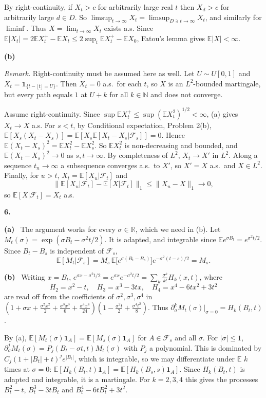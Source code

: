 \documentclass[11pt,a4paper]{article}
\newcommand{\E}{\mathbb{E}}
\newcommand{\R}{\mathbb{R}}
\newcommand{\N}{\mathbb{N}}
\newcommand{\F}{\mathcal{F}}
\newcommand{\1}{\mathbf{1}}
\newcommand{\prob}[1]{\par\medskip\noindent\textbf{#1}\quad}
\newcommand{\sub}[1]{\par\smallskip\noindent\textbf{#1}\ }
\newcommand{\note}[1]{\par\noindent\emph{Remark.} #1}
\begin{document}
By right-continuity, if $X_t>c$ for arbitrarily large real $t$ then $X_d>c$ for arbitrarily large $d\in D$. So
$\limsup_{t\to\infty}X_t=\limsup_{D\ni t\to\infty}X_t$, and similarly for $\liminf$. Thus $X=\lim_{t\to\infty}X_t$ exists a.s.
Since $\E|X_t|=2\E X_t^+-\E X_t\le2\sup_t\E X_t^+-\E X_0$, Fatou's lemma gives $\E|X|<\infty$.

\sub{(b)} \note{Right-continuity must be assumed here as well. Let $U\sim U[0,1]$ and
$X_t=\1_{\{t-\lfloor t\rfloor=U\}}$. Then $X_t=0$ a.s.\ for each $t$, so $X$ is an $L^2$-bounded martingale, but
every path equals $1$ at $U+k$ for all $k\in\N$ and does not converge.}

Assume right-continuity. Since $\sup\E X_t^+\le\sup(\E X_t^2)^{1/2}<\infty$, (a) gives $X_t\to X$ a.s.
For $s<t$, by Conditional expectation, Problem 2(b), $\E[X_s(X_t-X_s)]=\E[X_s\E[X_t-X_s|\F_s]]=0$. Hence
$\E(X_t-X_s)^2=\E X_t^2-\E X_s^2$. So $\E X_t^2$ is non-decreasing and bounded, and $\E(X_t-X_s)^2\to0$ as $s,t\to\infty$.
By completeness of $L^2$, $X_t\to X'$ in $L^2$. Along a sequence $t_n\to\infty$ a subsequence converges a.s.\ to $X'$,
so $X'=X$ a.s.\ and $X\in L^2$. Finally, for $u>t$, $X_t=\E[X_u|\F_t]$ and
\[\|\E[X_u|\F_t]-\E[X|\F_t]\|_1\le\|X_u-X\|_1\to0,\]
so $\E[X|\F_t]=X_t$ a.s.

\prob{6.}
\sub{(a)} The argument works for every $\sigma\in\R$, which we need in (b). Let $M_t(\sigma)=\exp(\sigma
B_t-\sigma^2t/2)$. It is adapted, and integrable since $\E e^{\sigma B_t}=e^{\sigma^2t/2}$. Since $B_t-B_s$ is independent
of $\F_s$,
\[\E[M_t|\F_s]=M_s\,\E\big[e^{\sigma(B_t-B_s)}\big]e^{-\sigma^2(t-s)/2}=M_s.\]

\sub{(b)} Writing $x=B_t$,
$e^{\sigma x-\sigma^2t/2}=e^{\sigma x}e^{-\sigma^2t/2}=\sum_k\frac{\sigma^k}{k!}H_k(x,t)$, where
\[
H_2=x^2-t,\quad H_3=x^3-3tx,\quad H_4=x^4-6tx^2+3t^2
\]
are read off from the coefficients of $\sigma^2,\sigma^3,\sigma^4$ in
$(1+\sigma x+\frac{\sigma^2x^2}2+\frac{\sigma^3x^3}6+\frac{\sigma^4x^4}{24})(1-\frac{\sigma^2t}2+\frac{\sigma^4t^2}8)$.
Thus $\partial_\sigma^kM_t(\sigma)|_{\sigma=0}=H_k(B_t,t)$.

By (a), $\E[M_t(\sigma)\1_A]=\E[M_s(\sigma)\1_A]$ for $A\in\F_s$ and all $\sigma$. For $|\sigma|\le1$,
$\partial^j_\sigma M_t(\sigma)=P_j(B_t-\sigma t,t)M_t(\sigma)$ with $P_j$ a polynomial. This is dominated by
$C_j(1+|B_t|+t)^je^{|B_t|}$, which is integrable, so we may differentiate under $\E$ $k$ times at $\sigma=0$:
$\E[H_k(B_t,t)\1_A]=\E[H_k(B_s,s)\1_A]$. Since $H_k(B_t,t)$ is adapted and integrable, it is a martingale. For
$k=2,3,4$ this gives the processes $B_t^2-t$, $B_t^3-3tB_t$ and $B_t^4-6tB_t^2+3t^2$.
\end{document}
